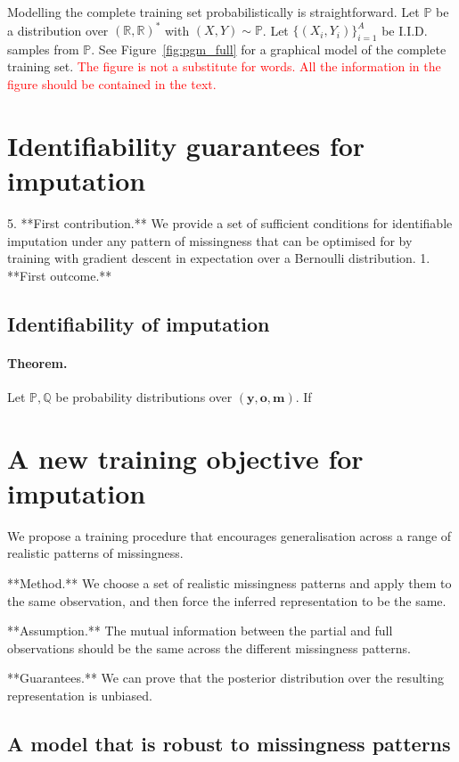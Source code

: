 \documentclass[a4paper,12pt,twoside,openright]{article}
\newcommand{\crit}[1]{\textcolor{red}{#1}}
\begin{document}
Modelling the complete training set probabilistically is straightforward. Let $\mathbb{P}$ be a distribution over $(\mathbb{R}, \mathbb{R})^*$ with $(X, Y) \sim \mathbb{P}$. Let $\{(X_i, Y_i)\}_{i=1}^{A}$ be I.I.D. samples from $\mathbb{P}$. See Figure~\ref{fig:pgm_full} for a graphical model of the complete training set. \crit{The figure is not a substitute for words. All the information in the figure should be contained in the text.}

\section{Identifiability guarantees for imputation}

5. **First contribution.** We provide a set of sufficient conditions for identifiable imputation under any pattern of missingness that can be optimised for by training with gradient descent in expectation over a Bernoulli distribution.
   1. **First outcome.**

\subsection{Identifiability of imputation}

\paragraph{Theorem.} Let $\mathbb{P}, \mathbb{Q}$ be probability distributions over $(\mathbf{y}, \mathbf{o}, \mathbf{m})$. If 

\section{A new training objective for imputation}

We propose a training procedure that encourages generalisation across a range of realistic patterns of missingness.

**Method.** We choose a set of realistic missingness patterns and apply them to the same observation, and then force the inferred representation to be the same.

**Assumption.** The mutual information between the partial and full observations should be the same across the different missingness patterns.

**Guarantees.** We can prove that the posterior distribution over the resulting representation is unbiased.

\subsection{A model that is robust to missingness patterns}
\end{document}
